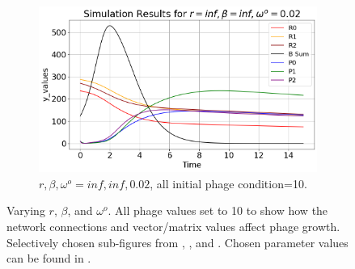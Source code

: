\begin{figure}[]
\begin{subfigure}{0.32\linewidth}
        \includegraphics[width=\linewidth]{Images/Plots/Created/UA/r_beta_washout_inf_inf_0.02.png}
        \caption{
            $r, \beta, \omega^o = inf, inf, 0.02$, all initial phage condition=10. 
        }
        \label{fig:created:r_beta_washout_inf_inf_0.02}
    \end{subfigure}
    \caption{
        Varying $r$, $\beta$, and $\omega^o$. 
        All phage values set to 10 to show how the network connections and vector/matrix values affect phage growth. 
        Selectively chosen sub-figures from , , and . 
        Chosen parameter values can be found in . 
    }
\end{figure}